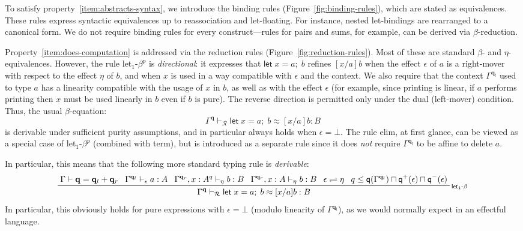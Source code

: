 \documentclass[acmsmall,screen,anonymous,review]{acmart}
\newcommand{\mc}[1]{\ensuremath{\mathcal{#1}}}
\newcommand{\mb}[1]{\ensuremath{\mathbf{#1}}}
\newcommand{\ms}[1]{\ensuremath{\mathsf{#1}}}
\newcommand{\letexpr}[3]{\ensuremath{\ms{let}\;#1 = #2;\;#3}}
\newcommand{\qsp}[4]{#1 \vdash #2 = #3 + #4}
\newcommand{\rle}[1]{{\scriptsize\textsf{#1}}}
\newcommand{\hasty}[4]{#1 \vdash_{#2} #3: {#4}}
\newcommand{\teqv}{\approx}
\newcommand{\tmeq}[5]{#1 \vdash_{#2} #3 \teqv #4 : {#5}}
\newcommand{\brle}[1]{{\textsf{#1}}}
\newcommand{\slides}{\rightleftharpoons}
\newcommand{\alquant}{\ms{q}}
\begin{document}
To satisfy property~\ref{item:abstracts-syntax}, we introduce the binding rules
(Figure~\ref{fig:binding-rules}), which are stated as equivalences. These rules express syntactic
equivalences up to reassociation and let-floating. For instance, nested let-bindings are rearranged
to a canonical form. We do not require binding rules for every construct—rules for pairs and sums,
for example, can be derived via $\beta$-reduction.

Property~\ref{item:does-computation} is addressed via the reduction rules
(Figure~\ref{fig:reduction-rules}). Most of these are standard $\beta$- and $\eta$-equivalences.
However, the rule \brle{let$_1$-$\beta^p$} is \emph{directional}: it expresses that
$\letexpr{x}{a}{b}$ refines $[x/a]b$ when the effect $\epsilon$ of $a$ is a right-mover with respect
to the effect $\eta$ of $b$, and when $x$ is used in a way compatible with $\epsilon$ and the
context. We also require that the context $\Gamma^{\mb{q}_l}$ used to type $a$ has a linearity
compatible with the usage of $x$ in $b$, as well as with the effect $\epsilon$ (for example, since
printing is linear, if $a$ performs printing then $x$ must be used linearly in $b$ even if $b$ is
pure). The reverse direction is permitted only under the dual (left-mover) condition. Thus, the
usual $\beta$-equation:
\[
\tmeq{\Gamma^{\mb{q}}}{\mc{R}}{\letexpr{x}{a}{b}}{[x/a]b}{B}
\]
is derivable under sufficient purity assumptions, and in particular always holds when $\epsilon =
\bot$. 
%
The rule \brle{elim}, at first glance, can be viewed as a special case of \brle{let$_1$-$\beta^p$}
(combined with \brle{term}), but is introduced as a separate rule since it does \emph{not} require
$\Gamma^{\mb{q}_l}$ to be affine to delete $a$.

In particular, this means that the following more standard typing rule is \emph{derivable}:
\begin{equation}
  \prftree[r]{\rle{let$_1$-$\beta$}}
  {\qsp{\Gamma}{\mb{q}}{\mb{q}_l}{\mb{q}_r}}
  {\hasty{\Gamma^{\mb{q}_l}}{\epsilon}{a}{A}}
  {\hasty{\Gamma^{\mb{q}_r}, x : A^q}{\eta}{b}{B}}
  {\hasty{\Gamma^{\mb{q}_r}, x : A}{\eta}{b}{B}}
  {\epsilon \slides \eta}
  {q \leq \alquant(\Gamma^{\mb{q}_l}) \sqcap \alquant^+(\epsilon) \sqcap \alquant^-(\epsilon)}
  {
    \tmeq{\Gamma^{\mb{q}}}{\mc{R}}{\letexpr{x}{a}{b}}{[x/a]b}{B}
  }
\end{equation}
In particular, this obviously holds for pure expressions with $\epsilon = \bot$ (modulo linearity of
$\Gamma^{\mb{q}_l}$), as we would normally expect in an effectful language.
\end{document}
